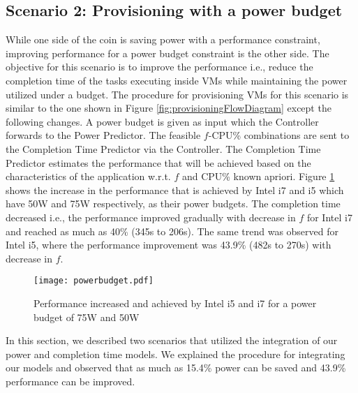 \documentclass{sig-alternate}
\begin{document}
\subsection{Scenario 2: Provisioning with a power budget}
While one side of the coin is saving power with a performance constraint, improving performance for a power budget constraint is the other side. The objective for this scenario is to improve the performance i.e., reduce the completion time of the tasks executing inside VMs while maintaining the power utilized under a budget. The procedure for provisioning VMs for this scenario is similar to  the one shown in Figure \ref{fig:provisioningFlowDiagram} except the following changes.  A power budget is given as input which the Controller forwards to the Power Predictor. The feasible $f$-CPU\% combinations are sent to the Completion Time Predictor via the Controller. The Completion Time Predictor estimates the performance that will be achieved based on the characteristics of the application w.r.t. $f$ and CPU\% known apriori. Figure \ref{fig:powerbudget} shows the increase in the performance that is achieved by Intel i7 and i5 which have 50W and 75W respectively, as their power budgets. The completion time decreased i.e., the performance improved gradually with decrease in $f$ for Intel i7 and reached as much as 40\% (345s to 206s). The same trend was observed for Intel i5, where the performance improvement was 43.9\% (482s to 270s) with decrease in $f$. 


\begin{figure}[!htbp]
\centering
\texttt{[image: powerbudget.pdf]}
 \vspace{-0.5cm}
\caption{Performance increased and achieved by Intel i5 and i7 for a power budget of 75W and 50W}
\label{fig:powerbudget}
\end{figure}

In this section, we described two scenarios that utilized the integration of our power and completion time models. We explained the procedure for integrating our models and observed that as much as 15.4\% power can be saved and 43.9\% performance can be improved. 
\end{document}
